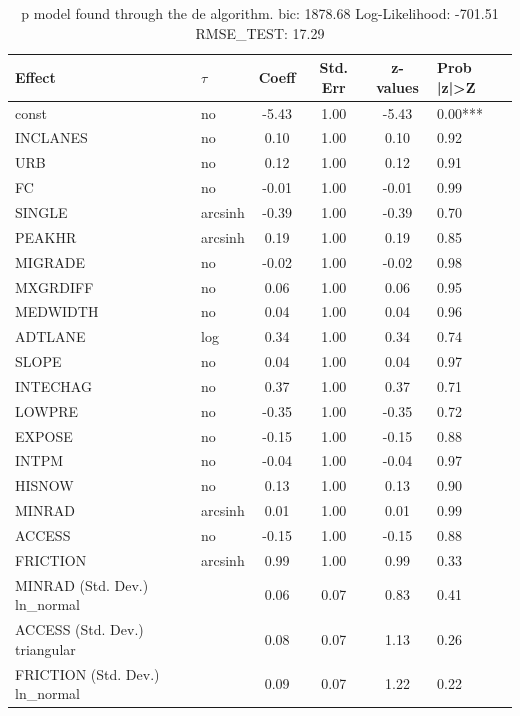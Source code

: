\begin{table}
	\caption{p model found through the de algorithm. bic: 1878.68 Log-Likelihood: -701.51 RMSE_TEST: 17.29}
	\begin{center}
		\begin{tabular}{|l|l|c|c|c|l|}
			\hline
			Effect & $\tau$ & Coeff & Std. Err & z-values & Prob |z|>Z \\
			\hline
			const & no & -5.43 & 1.00 & -5.43 & 0.00*** \\
			\hline
			INCLANES & no & 0.10 & 1.00 & 0.10 & 0.92 \\
			\hline
			URB & no & 0.12 & 1.00 & 0.12 & 0.91 \\
			\hline
			FC & no & -0.01 & 1.00 & -0.01 & 0.99 \\
			\hline
			SINGLE & arcsinh & -0.39 & 1.00 & -0.39 & 0.70 \\
			\hline
			PEAKHR & arcsinh & 0.19 & 1.00 & 0.19 & 0.85 \\
			\hline
			MIGRADE & no & -0.02 & 1.00 & -0.02 & 0.98 \\
			\hline
			MXGRDIFF & no & 0.06 & 1.00 & 0.06 & 0.95 \\
			\hline
			MEDWIDTH & no & 0.04 & 1.00 & 0.04 & 0.96 \\
			\hline
			ADTLANE & log & 0.34 & 1.00 & 0.34 & 0.74 \\
			\hline
			SLOPE & no & 0.04 & 1.00 & 0.04 & 0.97 \\
			\hline
			INTECHAG & no & 0.37 & 1.00 & 0.37 & 0.71 \\
			\hline
			LOWPRE & no & -0.35 & 1.00 & -0.35 & 0.72 \\
			\hline
			EXPOSE & no & -0.15 & 1.00 & -0.15 & 0.88 \\
			\hline
			INTPM & no & -0.04 & 1.00 & -0.04 & 0.97 \\
			\hline
			HISNOW & no & 0.13 & 1.00 & 0.13 & 0.90 \\
			\hline
			MINRAD & arcsinh & 0.01 & 1.00 & 0.01 & 0.99 \\
			\hline
			ACCESS & no & -0.15 & 1.00 & -0.15 & 0.88 \\
			\hline
			FRICTION & arcsinh & 0.99 & 1.00 & 0.99 & 0.33 \\
			\hline
			MINRAD (Std. Dev.) ln_normal &  & 0.06 & 0.07 & 0.83 & 0.41 \\
			\hline
			ACCESS (Std. Dev.) triangular &  & 0.08 & 0.07 & 1.13 & 0.26 \\
			\hline
			FRICTION (Std. Dev.) ln_normal &  & 0.09 & 0.07 & 1.22 & 0.22 \\
			\hline
		\end{tabular}
	\end{center}
\end{table}